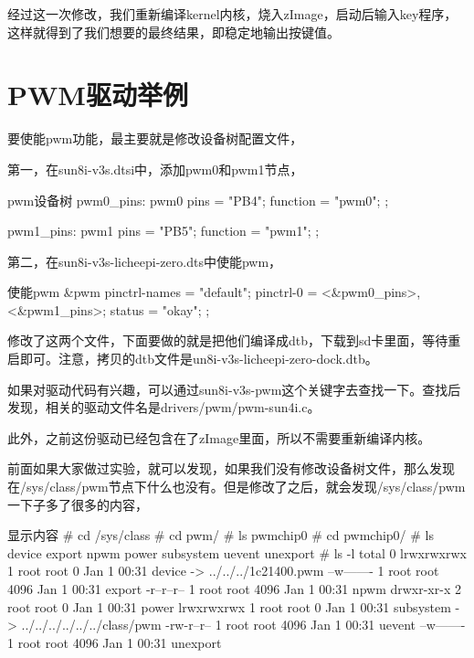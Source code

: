 \documentclass[lang=cn,newtx,10pt,scheme=chinese]{elegantbook}
\begin{document}
经过这一次修改，我们重新编译kernel内核，烧入zImage，启动后输入key程序，这样就得到了我们想要的最终结果，即稳定地输出按键值。

\chapter{PWM驱动举例}

要使能pwm功能，最主要就是修改设备树配置文件，

第一，在sun8i-v3s.dtsi中，添加pwm0和pwm1节点，

\begin{mycode}{pwm设备树}
pwm0_pins: pwm0 {
    pins = "PB4";
    function = "pwm0";
};

pwm1_pins: pwm1 {
    pins = "PB5";
    function = "pwm1";
};
\end{mycode}

第二，在sun8i-v3s-licheepi-zero.dts中使能pwm，

\begin{mycode}{使能pwm}
&pwm {
    pinctrl-names = "default";
    pinctrl-0 = <&pwm0_pins>, <&pwm1_pins>;
    status = "okay";
};
\end{mycode}

修改了这两个文件，下面要做的就是把他们编译成dtb，下载到sd卡里面，等待重启即可。注意，拷贝的dtb文件是un8i-v3s-licheepi-zero-dock.dtb。

如果对驱动代码有兴趣，可以通过sun8i-v3s-pwm这个关键字去查找一下。查找后发现，相关的驱动文件名是drivers/pwm/pwm-sun4i.c。

此外，之前这份驱动已经包含在了zImage里面，所以不需要重新编译内核。

前面如果大家做过实验，就可以发现，如果我们没有修改设备树文件，那么发现在/sys/class/pwm节点下什么也没有。但是修改了之后，就会发现/sys/class/pwm一下子多了很多的内容，

\begin{mycode}{显示内容}
# cd /sys/class
# cd pwm/
# ls
pwmchip0
# cd pwmchip0/
# ls
device     export     npwm       power      subsystem  uevent     unexport
# ls -l
total 0
lrwxrwxrwx    1 root     root             0 Jan  1 00:31 device -> ../../../1c21400.pwm
--w-------    1 root     root          4096 Jan  1 00:31 export
-r--r--r--    1 root     root          4096 Jan  1 00:31 npwm
drwxr-xr-x    2 root     root             0 Jan  1 00:31 power
lrwxrwxrwx    1 root     root             0 Jan  1 00:31 subsystem -> ../../../../../../class/pwm
-rw-r--r--    1 root     root          4096 Jan  1 00:31 uevent
--w-------    1 root     root          4096 Jan  1 00:31 unexport
\end{mycode}
\end{document}
